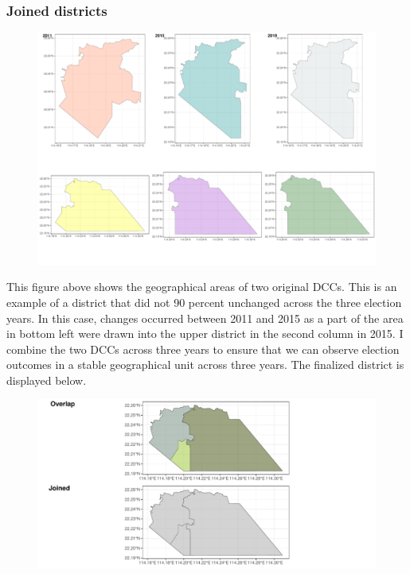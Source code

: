 \documentclass[letterpaper, 12pt]{article}
\begin{document}
\begin{appendices}
\subsubsection*{Joined districts}
\begin{figure}[!h]
    \centering
    \includegraphics[scale=0.4]{Visuals/changed_joined.pdf}
        \label{joined}
\end{figure}

This figure above shows the geographical areas of two original DCCs. This is an example of a district that did not 90 percent unchanged across the three election years. In this case, changes occurred between 2011 and 2015 as a part of the area in bottom left were drawn into the upper district in the second column in 2015. I combine the two DCCs across three years to ensure that we can observe election outcomes in a stable geographical unit across three years. The finalized district is displayed below.



\begin{figure}[!h]
    \centering
    \includegraphics[scale=0.7]{Visuals/combined-final.pdf}
        \label{joined}
\end{figure}


\end{appendices}
\end{document}
